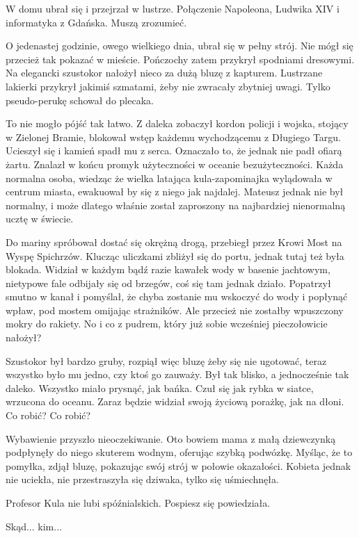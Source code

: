 W domu ubrał się i przejrzał w lustrze.
Połączenie Napoleona, Ludwika XIV i informatyka z Gdańska.
Muszą zrozumieć.

O jedenastej godzinie, owego wielkiego dnia, ubrał się w pełny strój.
Nie mógł się przecież tak pokazać w mieście.
Pończochy zatem przykrył spodniami dresowymi.
Na elegancki szustokor nałożył nieco za dużą bluzę z kapturem.
Lustrzane lakierki przykrył jakimiś szmatami, żeby nie zwracały zbytniej uwagi.
Tylko pseudo-perukę schował do plecaka.

To nie mogło pójść tak łatwo.
Z daleka zobaczył kordon policji i wojska, stojący w Zielonej Bramie, blokował wstęp każdemu wychodzącemu z Długiego Targu.
Ucieszył się i kamień spadł mu z serca. Oznaczało to, że jednak nie padł ofiarą żartu.
Znalazł w końcu promyk użyteczności w oceanie bezużyteczności. Każda normalna osoba, wiedząc że wielka latająca kula-zapominajka wylądowała w centrum miasta,
ewakuował by się z niego jak najdalej. 
Mateusz jednak nie był normalny, i może dlatego właśnie został zaproszony na najbardziej nienormalną ucztę w świecie.

Do mariny spróbował dostać się okrężną drogą, przebiegł przez Krowi Most na Wyspę Spichrzów.
Klucząc uliczkami zbliżył się do portu, jednak tutaj też była blokada.
Widział w każdym bądź razie kawałek wody w basenie jachtowym, nietypowe fale odbijały się od brzegów, coś się tam jednak działo.
Popatrzył smutno w kanał i pomyślał, że chyba zostanie mu wskoczyć do wody i popłynąć wpław, pod mostem omijając strażników.
Ale przecież nie zostałby wpuszczony mokry do rakiety.
No i co z pudrem, który już sobie wcześniej pieczołowicie nałożył?

Szustokor był bardzo gruby, rozpiął więc bluzę żeby się nie ugotować, teraz wszystko było mu jedno, czy ktoś go zauważy.
Był tak blisko, a jednocześnie tak daleko. Wszystko miało prysnąć, jak bańka.
Czuł się jak rybka w siatce, wrzucona do oceanu.
Zaraz będzie widział swoją życiową porażkę, jak na dłoni.
Co robić? Co robić?

Wybawienie przyszło nieoczekiwanie.
Oto bowiem mama z małą dziewczynką podpłynęły do niego skuterem wodnym, oferując szybką podwózkę.
Myśląc, że to pomyłka, zdjął bluzę, pokazując swój strój w połowie okazałości.
Kobieta jednak nie uciekła, nie przestraszyła się dziwaka, tylko się uśmiechnęła.

\ds{} Profesor Kula nie lubi spóźnialskich. Pospiesz się \dm{} powiedziała. \de{}

\ds{} Skąd... kim... \de{}

